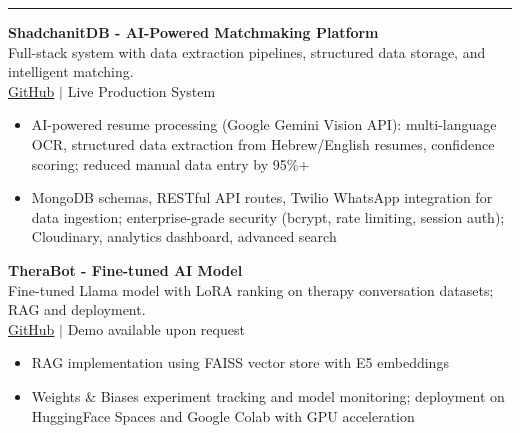 \documentclass[10.5pt]{article}
\newcommand{\cvsection}[1]{
    \vspace{0.1in}
    \noindent{\large \textbf{#1}}
    \vspace{0.02in}
    \hrule
    \vspace{0.04in}
}
\begin{document}
\cvsection{Projects}
\noindent\textbf{ShadchanitDB - AI-Powered Matchmaking Platform}\\
Full-stack system with data extraction pipelines, structured data storage, and intelligent matching.\\
\href{https://github.com/NatanelRichey/ShadchanitDB}{GitHub} $|$ Live Production System
\vspace{0.3em}\begin{itemize}[topsep=0pt, itemsep=2pt, parsep=0pt, partopsep=0pt]
    \item AI-powered resume processing (Google Gemini Vision API): multi-language OCR, structured data extraction from Hebrew/English resumes, confidence scoring; reduced manual data entry by 95\%+
    \item MongoDB schemas, RESTful API routes, Twilio WhatsApp integration for data ingestion; enterprise-grade security (bcrypt, rate limiting, session auth); Cloudinary, analytics dashboard, advanced search
\end{itemize}
\vspace{0.5em}
\noindent\textbf{TheraBot - Fine-tuned AI Model}\\
Fine-tuned Llama model with LoRA ranking on therapy conversation datasets; RAG and deployment.\\
\href{https://github.com/NatanelRichey/therabot}{GitHub} $|$ Demo available upon request
\vspace{0.3em}\begin{itemize}[topsep=0pt, itemsep=2pt, parsep=0pt, partopsep=0pt]
    \item RAG implementation using FAISS vector store with E5 embeddings
    \item Weights \& Biases experiment tracking and model monitoring; deployment on HuggingFace Spaces and Google Colab with GPU acceleration
\end{itemize}
\vspace{0.5em}
\end{document}
